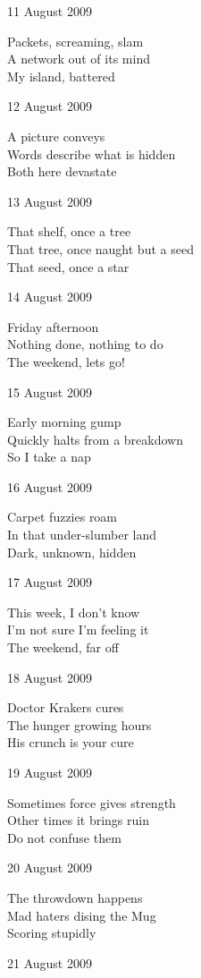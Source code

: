 \documentclass[12pt]{article}
\begin{document}
11 August 2009

Packets, screaming, slam \\
A network out of its mind \\
My island, battered

12 August 2009

A picture conveys \\
Words describe what is hidden \\
Both here devastate

13 August 2009

That shelf, once a tree \\
That tree, once naught but a seed \\
That seed, once a star

14 August 2009

Friday afternoon \\
Nothing done, nothing to do \\
The weekend, lets go!

15 August 2009

Early morning gump \\
Quickly halts from a breakdown \\
So I take a nap

16 August 2009

Carpet fuzzies roam \\
In that under-slumber land \\
Dark, unknown, hidden

17 August 2009

This week, I don't know \\
I'm not sure I'm feeling it \\
The weekend, far off

\newpage


18 August 2009

Doctor Krakers cures \\
The hunger growing hours \\
His crunch is your cure

19 August 2009

Sometimes force gives strength \\
Other times it brings ruin \\
Do not confuse them

20 August 2009

The throwdown happens \\
Mad haters dising the Mug \\
Scoring stupidly

21 August 2009
\end{document}
